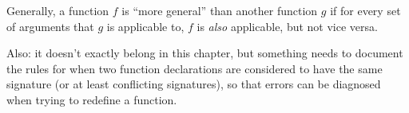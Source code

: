 \begin{TODO}
Generally, a function $f$ is ``more general'' than another function $g$ if for every set of arguments that $g$ is applicable to, $f$ is \emph{also} applicable, but not vice versa.

Also: it doesn't exactly belong in this chapter, but something needs to document the rules for when two function declarations are considered to have the same signature (or at least conflicting signatures), so that errors can be diagnosed when trying to redefine a function.

\end{TODO}
